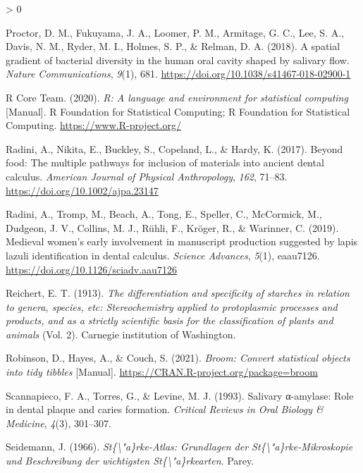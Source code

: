 \documentclass[
]{article}
\newlength{\cslhangindent}
\newenvironment{CSLReferences}[2] %
 {%
  \setlength{\parindent}{0pt}
  \ifodd #1 \everypar{\setlength{\hangindent}{\cslhangindent}}\ignorespaces\fi
  \ifnum #2 > 0
  \setlength{\parskip}{#2\baselineskip}
  \fi
 }%
 {}
\begin{document}
\begin{CSLReferences}{1}{0}
\leavevmode\hypertarget{ref-proctorSpatialGradient2018}{}%
Proctor, D. M., Fukuyama, J. A., Loomer, P. M., Armitage, G. C., Lee, S. A., Davis, N. M., Ryder, M. I., Holmes, S. P., \& Relman, D. A. (2018). A spatial gradient of bacterial diversity in the human oral cavity shaped by salivary flow. \emph{Nature Communications}, \emph{9}(1), 681. \url{https://doi.org/10.1038/s41467-018-02900-1}

\leavevmode\hypertarget{ref-R-base}{}%
R Core Team. (2020). \emph{R: A language and environment for statistical computing} {[}Manual{]}. {R Foundation for Statistical Computing}; {R Foundation for Statistical Computing}. \url{https://www.R-project.org/}

\leavevmode\hypertarget{ref-radiniFoodMultiplePathways2017}{}%
Radini, A., Nikita, E., Buckley, S., Copeland, L., \& Hardy, K. (2017). Beyond food: The multiple pathways for inclusion of materials into ancient dental calculus. \emph{American Journal of Physical Anthropology}, \emph{162}, 71--83. \url{https://doi.org/10.1002/ajpa.23147}

\leavevmode\hypertarget{ref-radiniMedievalWomenEarly2019}{}%
Radini, A., Tromp, M., Beach, A., Tong, E., Speller, C., McCormick, M., Dudgeon, J. V., Collins, M. J., Rühli, F., Kröger, R., \& Warinner, C. (2019). Medieval women's early involvement in manuscript production suggested by lapis lazuli identification in dental calculus. \emph{Science Advances}, \emph{5}(1), eaau7126. \url{https://doi.org/10.1126/sciadv.aau7126}

\leavevmode\hypertarget{ref-reichertStarchBible1913b}{}%
Reichert, E. T. (1913). \emph{The differentiation and specificity of starches in relation to genera, species, etc: Stereochemistry applied to protoplasmic processes and products, and as a strictly scientific basis for the classification of plants and animals} (Vol. 2). {Carnegie institution of Washington}.

\leavevmode\hypertarget{ref-R-broom}{}%
Robinson, D., Hayes, A., \& Couch, S. (2021). \emph{Broom: Convert statistical objects into tidy tibbles} {[}Manual{]}. \url{https://CRAN.R-project.org/package=broom}

\leavevmode\hypertarget{ref-scannapiecoSalivaryAmylase1993}{}%
Scannapieco, F. A., Torres, G., \& Levine, M. J. (1993). Salivary α-amylase: Role in dental plaque and caries formation. \emph{Critical Reviews in Oral Biology \& Medicine}, \emph{4}(3), 301--307.

\leavevmode\hypertarget{ref-seidemannStarchAtlas1966}{}%
Seidemann, J. (1966). \emph{St\{\textbackslash"a\}rke-{Atlas}: Grundlagen der {St}\{\textbackslash"a\}rke-{Mikroskopie} und {Beschreibung} der wichtigsten {St}\{\textbackslash"a\}rkearten}. {Parey}.


\end{CSLReferences}
\end{document}
